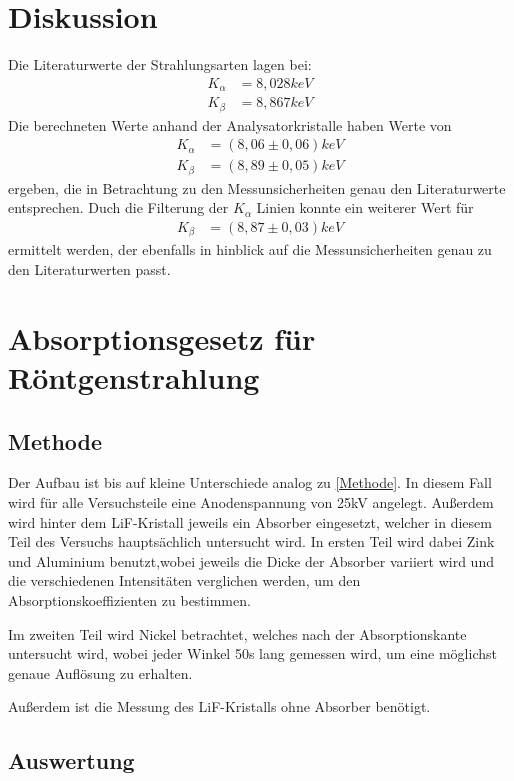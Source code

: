 \documentclass[
	a4paper,
	12pt,
	pagesize,
	ngerman
]{scrartcl}
\begin{document}
\section{Diskussion}
Die Literaturwerte der Strahlungsarten lagen bei:
\begin{align*}
    K_{\alpha} &= 8,028 keV \\
    K_{\beta} &= 8,867 keV
\end{align*}
Die berechneten Werte anhand der Analysatorkristalle haben Werte von
\begin{align*}
    K_{\alpha} &= (8,06 \pm 0,06) keV \\
    K_{\beta} &= (8,89 \pm 0,05) keV
\end{align*}
ergeben, die in Betrachtung zu den Messunsicherheiten genau den Literaturwerte entsprechen. Duch die Filterung der $K_{\alpha}$ Linien konnte ein weiterer Wert für 
\begin{align*}
    K_{\beta} &= (8,87 \pm 0,03)keV
\end{align*}
ermittelt werden, der ebenfalls in hinblick auf die Messunsicherheiten genau zu den Literaturwerten passt.





\section{Absorptionsgesetz für Röntgenstrahlung}
\subsection{Methode}
Der Aufbau ist bis auf kleine Unterschiede analog zu \cref{Methode}. In diesem Fall wird für alle Versuchsteile eine Anodenspannung von 25kV angelegt. Außerdem wird hinter dem LiF-Kristall jeweils ein Absorber eingesetzt, welcher in diesem Teil des Versuchs hauptsächlich untersucht wird. In ersten Teil wird dabei Zink und Aluminium benutzt,wobei jeweils die Dicke der Absorber variiert wird und die verschiedenen Intensitäten verglichen werden, um den Absorptionskoeffizienten zu bestimmen. 

Im zweiten Teil wird Nickel betrachtet, welches nach der Absorptionskante untersucht wird, wobei jeder Winkel 50s lang gemessen wird, um eine möglichst genaue Auflösung zu erhalten.

Außerdem ist die Messung des LiF-Kristalls ohne Absorber benötigt.
\subsection{Auswertung}
\end{document}
